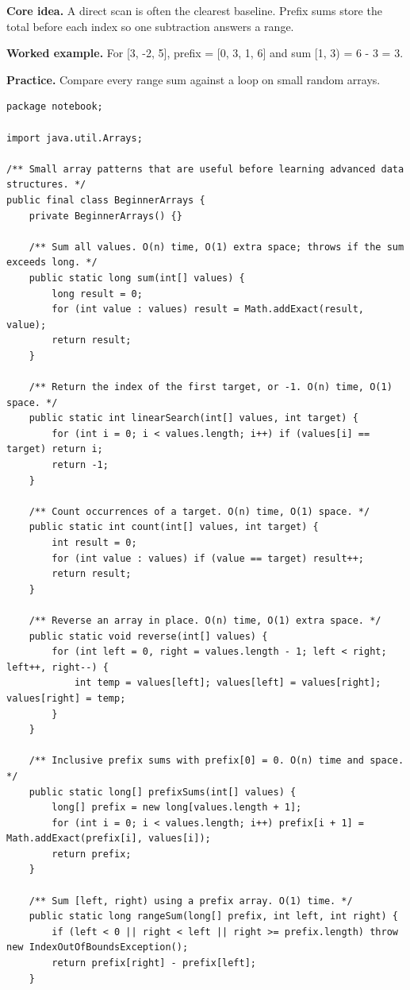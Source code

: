 \documentclass[10pt,letterpaper]{article}
\begin{document}
\noindent\textbf{Core idea.} A direct scan is often the clearest baseline. Prefix sums store the total before each index so one subtraction answers a range.\par
\noindent\textbf{Worked example.} For [3, -2, 5], prefix = [0, 3, 1, 6] and sum [1, 3) = 6 - 3 = 3.\par
\noindent\textbf{Practice.} Compare every range sum against a loop on small random arrays.\par
\begin{lstlisting}
package notebook;

import java.util.Arrays;

/** Small array patterns that are useful before learning advanced data structures. */
public final class BeginnerArrays {
    private BeginnerArrays() {}

    /** Sum all values. O(n) time, O(1) extra space; throws if the sum exceeds long. */
    public static long sum(int[] values) {
        long result = 0;
        for (int value : values) result = Math.addExact(result, value);
        return result;
    }

    /** Return the index of the first target, or -1. O(n) time, O(1) space. */
    public static int linearSearch(int[] values, int target) {
        for (int i = 0; i < values.length; i++) if (values[i] == target) return i;
        return -1;
    }

    /** Count occurrences of a target. O(n) time, O(1) space. */
    public static int count(int[] values, int target) {
        int result = 0;
        for (int value : values) if (value == target) result++;
        return result;
    }

    /** Reverse an array in place. O(n) time, O(1) extra space. */
    public static void reverse(int[] values) {
        for (int left = 0, right = values.length - 1; left < right; left++, right--) {
            int temp = values[left]; values[left] = values[right]; values[right] = temp;
        }
    }

    /** Inclusive prefix sums with prefix[0] = 0. O(n) time and space. */
    public static long[] prefixSums(int[] values) {
        long[] prefix = new long[values.length + 1];
        for (int i = 0; i < values.length; i++) prefix[i + 1] = Math.addExact(prefix[i], values[i]);
        return prefix;
    }

    /** Sum [left, right) using a prefix array. O(1) time. */
    public static long rangeSum(long[] prefix, int left, int right) {
        if (left < 0 || right < left || right >= prefix.length) throw new IndexOutOfBoundsException();
        return prefix[right] - prefix[left];
    }


\end{lstlisting}
\end{document}
